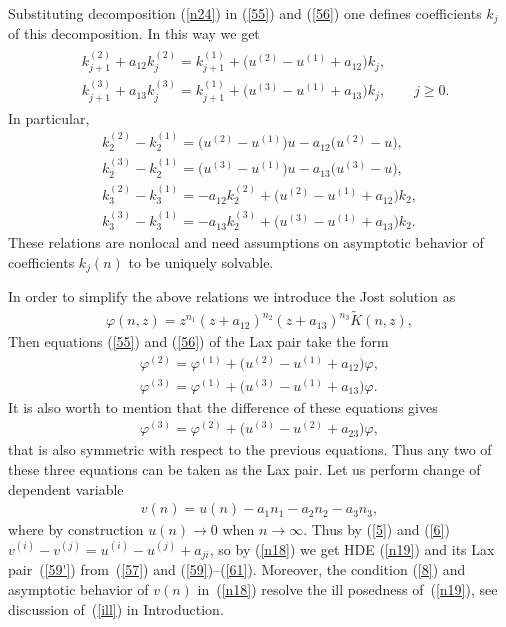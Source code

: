 \documentclass[pdftex]{sigma}
\numberwithin{equation}{section}
\begin{document}
Substituting decomposition (\ref{n24}) in (\ref{55}) and (\ref{56}) one def\/ines coef\/f\/icients $k_{j}$ of this decomposition. In this way we get
\begin{gather*}
\begin{split}
& k_{j+1}^{(2)}+a_{12}k_{j}^{(2)}=k_{j+1}^{(1)}+\big(u_{}^{(2)}-u_{}^{(1)}+a_{12}^{}\big)k_{j}^{},\\ %
& k_{j+1}^{(3)}+a_{13}k_{j}^{(3)}=k_{j+1}^{(1)}+\big(u_{}^{(3)}-u_{}^{(1)}+a_{13}^{}\big)k_{j}^{},\qquad j\geq0.%
\end{split}
\end{gather*}
In particular,
\begin{gather}
k_{2}^{(2)}-k_{2}^{(1)}=\big(u_{}^{(2)}-u_{}^{(1)}\big)u-a_{12}^{}\big(u_{}^{(2)}-u\big),\label{n:30}\\
k_{2}^{(3)}-k_{2}^{(1)}=\big(u_{}^{(3)}-u_{}^{(1)}\big)u-a_{13}^{}\big(u_{}^{(3)}-u\big),\label{n:31}\\
k_{3}^{(2)}-k_{3}^{(1)}=-a_{12}^{}k_{2}^{(2)}+\big(u_{}^{(2)}-u_{}^{(1)}+a_{12}^{}\big)k_{2},\label{n:32}\\
k_{3}^{(3)}-k_{3}^{(1)}=-a_{13}^{}k_{2}^{(3)}+\big(u_{}^{(3)}-u_{}^{(1)}+a_{13}^{}\big)k_{2}.\label{n:33}
\end{gather}
These relations are nonlocal and need assumptions on asymptotic behavior of coef\/f\/icients $k_{j}(n)$ to be uniquely solvable.

In order to simplify the above relations we introduce the Jost solution as
\begin{gather}
\varphi(n,z)=z^{n_1}(z+a_{12})^{n_2}(z+a_{13})^{n_3}\widetilde{K}(n,z),\label{58:1}
\end{gather}
Then equations (\ref{55}) and (\ref{56}) of the Lax pair take the form
\begin{gather}
\varphi^{(2)}=\varphi^{(1)}+\big(u^{(2)}-u^{(1)}+a_{12}\big)\varphi,\label{59} \\
 \varphi^{(3)}=\varphi^{(1)}+\big(u^{(3)}-u^{(1)}+a_{13}\big)\varphi.\label{60}
\end{gather}
It is also worth to mention that the dif\/ference of these equations gives
\begin{gather}
\varphi^{(3)}=\varphi^{(2)}+\big(u^{(3)}-u^{(2)}+a_{23}\big)\varphi,\label{61}
\end{gather}
that is also symmetric with respect to the previous equations. Thus any two of these three equations can be taken as the Lax pair. Let us perform change of dependent variable
\begin{gather}
v(n)=u(n)-a_1n_1-a_2n_2-a_3n_3,\label{n18}
\end{gather}
where by construction $u(n)\to0$ when $n\to\infty$. Thus by (\ref{5}) and (\ref{6}) $v^{(i)}-v^{(j)}=u^{(i)}-u^{(j)}+a_{ji}$, so by (\ref{n18}) we get HDE (\ref{n19}) and its Lax pair~(\ref{59'}) from~(\ref{57}) and (\ref{59})--(\ref{61}). Moreover, the condition (\ref{8}) and asymptotic behavior of $v(n)$ in~(\ref{n18}) resolve the ill posedness of~(\ref{n19}), see discussion of~(\ref{ill}) in Introduction.
\end{document}
